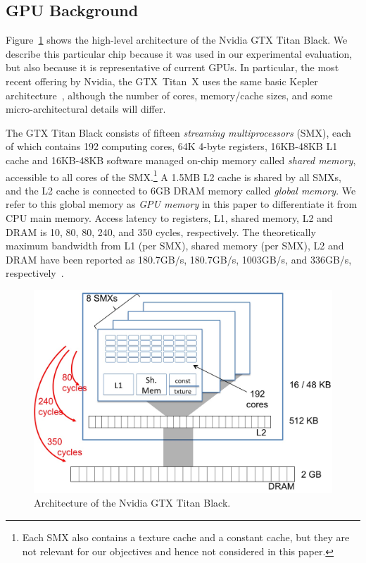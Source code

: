 \subsection{GPU Background}  \label{GPUBackground}

Figure~\ref{Nvidia680Arch} shows the high-level architecture of the Nvidia GTX Titan Black.
We describe this particular chip because it was used in our experimental evaluation, but also
because it is representative of current GPUs.
In particular, the most recent offering by Nvidia, the GTX~Titan~X uses the same basic Kepler
architecture~\cite{nvidia780}, although the number of cores, memory/cache sizes, and some
micro-architectural details will differ.

The GTX Titan Black consists of fifteen \emph{streaming multiprocessors} (SMX), 
each of which contains 192 computing cores, 64K 4-byte registers, 16KB-48KB L1 cache and 16KB-48KB
software managed on-chip memory called \emph{shared memory}, accessible to all cores of the
SMX.\footnote{ 
	Each SMX also contains a texture cache and a constant cache, 
	but they are not relevant for our objectives and hence not considered in this paper.}
A 1.5MB L2 cache is shared by all SMXs, and the L2 cache is connected to
6GB DRAM memory called \emph{global memory}.
We refer to this global memory as \emph{GPU memory} in this paper 
to differentiate it from CPU main memory.
Access latency to registers, L1, shared memory, L2 and DRAM is 10, 80, 80, 240, and 350 cycles,
respectively.
The theoretically maximum bandwidth from L1 (per SMX), shared memory (per SMX), L2 and DRAM have been reported as 180.7GB/s, 180.7GB/s,
1003GB/s, and 336GB/s, respectively~\cite{insideKepler}.


\begin{figure}
\center
\includegraphics[scale=0.3]{Nvidia680Arch.jpg}
\caption{\footnotesize\textnormal{Architecture of the Nvidia GTX Titan Black.}}
\label{Nvidia680Arch}
\end{figure}

